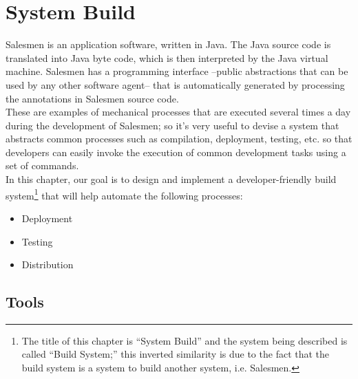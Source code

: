 \chapter{System Build}\label{BuildSystem}

Salesmen is an application software, written in Java. The Java source code
is translated into Java byte code, which is then interpreted by the Java
virtual machine. Salesmen has a programming interface --public abstractions
that can be used by any other software agent-- that is automatically
generated by processing the annotations in Salesmen source code. \\

These are examples of mechanical processes that are executed several times 
a day during the development of Salesmen; so it's very useful to devise a 
system that abstracts common processes such as compilation, deployment, 
testing, etc. so that developers can easily invoke the execution of
common development tasks using a set of commands.\\

In this chapter, our goal is to design and implement a 
developer-friendly build system\footnote{The title of this chapter is 
``System Build'' and the system being described is called 
``Build System;'' this inverted similarity is due to the fact that the 
build system is a system to build another system, i.e. Salesmen.}
that will help automate the following processes:

\begin{itemize}
\item
Deployment
\item
Testing
\item
Distribution
\end{itemize}

\section{Tools}\label{BuildSystemTools}

